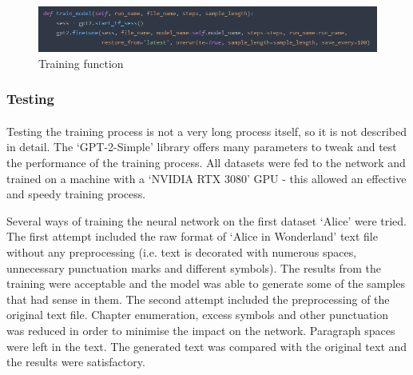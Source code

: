 \documentclass[12pt]{report}
\begin{document}
\begin{figure}[ht]
  \centering
  \includegraphics[width=1\linewidth]{img/train_model_example.png}
  \caption{Training function}
  \label{fig:train_model}
\end{figure}

\clearpage

\subsubsection*{Testing}
\paragraph{}
Testing the training process is not a very long process itself, so it is not described in detail. The `GPT-2-Simple'
library offers many parameters to tweak and test the performance of the training process. All datasets were fed to the
network and trained on a machine with a `NVIDIA RTX 3080' GPU - this allowed an effective and speedy training process.

Several ways of training the neural network on the first dataset `Alice' were tried. The first attempt included
the raw format of `Alice in Wonderland' text file without any preprocessing (i.e. text is decorated with numerous
spaces, unnecessary punctuation marks and different symbols). The results from the training were acceptable and
the model was able to generate some of the samples that had sense in them. The second attempt included the preprocessing
of the original text file. Chapter enumeration, excess symbols and other punctuation was reduced in order to
minimise the impact on the network. Paragraph spaces were left in the text. The generated text was compared with the
original text and the results were satisfactory.
\end{document}
